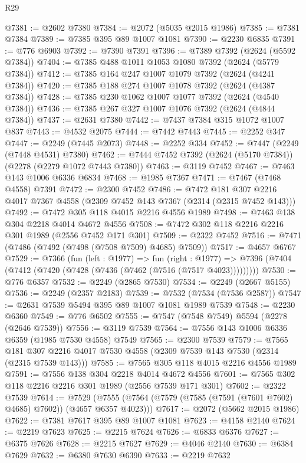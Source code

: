 \begin{lexlean}{R29}
\begin{coremodule}
@7381 := @2602 @7380
@7384 := @2072 (@5035 @2015 @1986)
@7385 := @7381 @7384
@7389 := @7385 @395 @89 @1007 @1081
@7390 := @2230 @6835
@7391 := @776 @6903
@7392 := @7390 @7391
@7396 := @7389 @7392 (@2624 (@5592 @7384))
@7404 := @7385 @488 @1011 @1053 @1080 @7392 (@2624 (@5779 @7384))
@7412 := @7385 @164 @247 @1007 @1079 @7392 (@2624 (@4241 @7384))
@7420 := @7385 @188 @274 @1007 @1078 @7392 (@2624 (@4387 @7384))
@7428 := @7385 @230 @1062 @1007 @1077 @7392 (@2624 (@4540 @7384))
@7436 := @7385 @267 @327 @1007 @1076 @7392 (@2624 (@4844 @7384))
@7437 := @2631 @7380
@7442 := @7437 @7384 @315 @1072 @1007 @837
@7443 := @4532 @2075
@7444 := @7442 @7443
@7445 := @2252 @347
@7447 := @2249 (@7445 @2073)
@7448 := @2252 @334
@7452 := @7447 (@2249 (@7448 @4531) @7380)
@7462 := @7444 @7452 @7392 (@2624 (@5170 @7384)) (@2278 (@2279 @1072 @7443 @7380))
@7463 := @3119 @7452
@7467 := @7463 @143 @1006 @6336 @6834
@7468 := @1985 @7367
@7471 := @7467 (@7468 @4558) @7391
@7472 := @2300 @7452
@7486 := @7472 @181 @307 @2216 @4017 @7367 @4558 (@2309 @7452 @143 @7367 (@2314 (@2315 @7452 @143)))
@7492 := @7472 @305 @118 @4015 @2216 @4556 @1989
@7498 := @7463 @138 @304 @2218 @4014 @4672 @4556
@7508 := @7472 @302 @118 @2216 @2216 @301 @1989 (@2556 @7452 @171 @301)
@7509 := @2322 @7452
@7516 := @7471 (@7486 (@7492 (@7498 (@7508 @7509) @4685) @7509))
@7517 := @4657 @6767
@7529 := @7366
    (fun (left : @1977) =>
    fun (right : @1977) =>
    @7396 (@7404 (@7412 (@7420 (@7428 (@7436 (@7462 (@7516 (@7517 @4023)))))))))
@7530 := @776 @6357
@7532 := @2249 (@2865 @7530)
@7534 := @2249 (@2667 @5155)
@7536 := @2249 (@2357 @2183)
@7539 := @7532 (@7534 (@7536 @2587))
@7547 := @2631 @7539 @5494 @395 @89 @1007 @1081 @1989 @7539
@7548 := @2230 @6360
@7549 := @776 @6502
@7555 := @7547 (@7548 @7549) @5594 (@2278 (@2646 @7539))
@7556 := @3119 @7539
@7564 := @7556 @143 @1006 @6336 @6359 (@1985 @7530 @4558) @7549
@7565 := @2300 @7539
@7579 := @7565 @181 @307 @2216 @4017 @7530 @4558 (@2309 @7539 @143 @7530 (@2314 (@2315 @7539 @143)))
@7585 := @7565 @305 @118 @4015 @2216 @4556 @1989
@7591 := @7556 @138 @304 @2218 @4014 @4672 @4556
@7601 := @7565 @302 @118 @2216 @2216 @301 @1989 (@2556 @7539 @171 @301)
@7602 := @2322 @7539
@7614 := @7529 (@7555 (@7564 (@7579 (@7585 (@7591 (@7601 @7602) @4685) @7602)) (@4657 @6357 @4023)))
@7617 := @2072 (@5662 @2015 @1986)
@7622 := @7381 @7617 @395 @89 @1007 @1081
@7623 := @4158 @2140
@7624 := @2219 @7623
@7625 := @2215 @7624
@7626 := @6833 @6376
@7627 := @6375 @7626
@7628 := @2215 @7627
@7629 := @4046 @2140
@7630 := @6384 @7629
@7632 := @6380 @7630 @6390
@7633 := @2219 @7632

\end{coremodule}
\end{lexlean}
